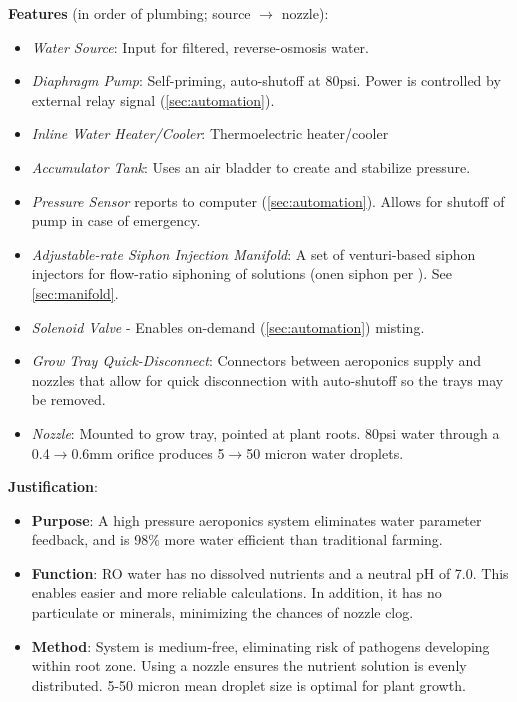 \documentclass{report}
\begin{document}
\textbf{Features} (in order of plumbing; source $\to$ nozzle):
\begin{itemize}
    \item \textit{Water Source}: Input for filtered, reverse-osmosis water.
    \item \textit{Diaphragm Pump}: Self-priming, auto-shutoff at 80psi. Power is controlled by external relay signal (\ref{sec:automation}).
    \item \textit{Inline Water Heater/Cooler}: Thermoelectric heater/cooler
    \item \textit{Accumulator Tank}: Uses an air bladder to create and stabilize pressure.
    \item \textit{Pressure Sensor} reports to computer (\ref{sec:automation}). Allows for shutoff of pump in case of emergency.
    \item \textit{Adjustable-rate Siphon Injection Manifold}: A set of venturi-based siphon injectors for flow-ratio siphoning of solutions (onen siphon per ). See \ref{sec:manifold}.
    \item \textit{Solenoid Valve} - Enables on-demand (\ref{sec:automation}) misting.
    \item \textit{Grow Tray Quick-Disconnect}: Connectors between aeroponics supply and nozzles that allow for quick disconnection with auto-shutoff so the trays may be removed.
    \item \textit{Nozzle}: Mounted to grow tray, pointed at plant roots. 80psi water through a 0.4$\to$0.6mm orifice produces 5$\to$50 micron water droplets. %
\end{itemize}

\textbf{Justification}: 
\begin{itemize}
    \item \textbf{Purpose}: A high pressure aeroponics system eliminates water parameter feedback, and is 98\% more water efficient than traditional farming.
    \item \textbf{Function}: RO water has no dissolved nutrients and a neutral pH of 7.0. This enables easier and more reliable calculations. In addition, it has no particulate or minerals, minimizing the chances of nozzle clog.
    \item \textbf{Method}: System is medium-free, eliminating risk of pathogens developing within root zone. Using a nozzle ensures the nutrient solution is evenly distributed. 5-50 micron mean droplet size is optimal for plant growth. %
\end{itemize}
\end{document}
